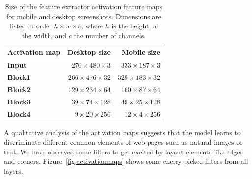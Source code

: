 \begin{table}
    \centering
    \begin{tabular}{lrr}
        \textbf{Activation map} & \textbf{Desktop size} & \textbf{Mobile size}\\\hline
        \textbf{Input} & $270\times480\times3$ & $333\times187\times3$\\
        \textbf{Block1} & $266\times476\times32$ & $329\times183\times32$\\
        \textbf{Block2} & $129\times234\times64$ & $160\times87\times64$\\
        \textbf{Block3} & $39\times74\times128$ & $49\times25\times128$\\
        \textbf{Block4} & $9\times20\times256$ & $12\times4\times256$\\
    \end{tabular}
    \caption[Size of feature extractor activation maps]{Size of the feature extractor activation feature maps for mobile and desktop screenshots. Dimensions are listed in order $h\times w\times c$, where $h$ is the height, $w$ the width, and $c$ the number of channels.}
    \label{tab:activationmaptensors}
\end{table}

A qualitative analysis of the activation maps suggests that the model learns to discriminate different common elements of web pages such as natural images or text. We have observed some filters to get excited by layout elements like edges and corners. Figure~\ref{fig:activationmaps} shows some cherry-picked filters from all layers.

